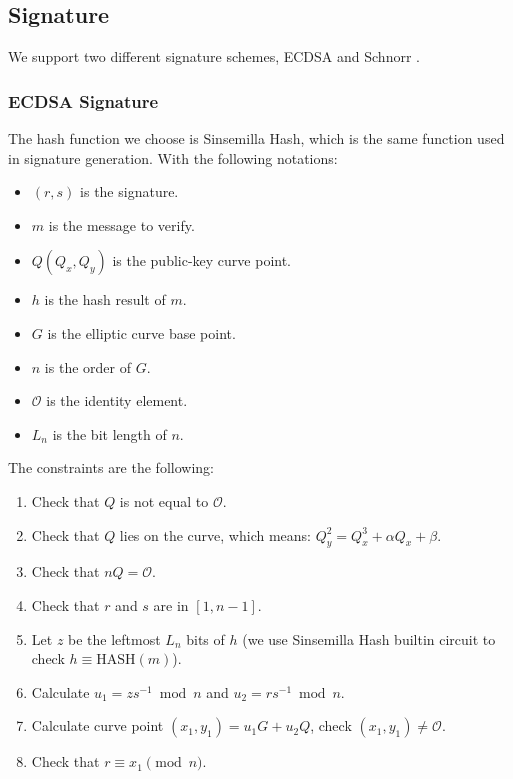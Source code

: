 \subsection{Signature}

We support two different signature schemes, ECDSA \cite{Johnson99theelliptic} and Schnorr \cite{jofc-1991-14302}.

\subsubsection{ECDSA Signature}

The hash function we choose is Sinsemilla Hash, which is the same function used in signature generation. With the following notations:
\begin{itemize}
    \item $(r, s)$ is the signature.
    \item $m$ is the message to verify.
    \item $Q(Q_x, Q_y)$ is the public-key curve point.
    \item $h$ is the hash result of $m$.
    \item $G$ is the elliptic curve base point.
    \item $n$ is the order of $G$.
    \item $\mathcal{O}$ is the identity element.
    \item $L_n$ is the bit length of $n$.
\end{itemize}

The constraints are the following:
\begin{enumerate}
    \item Check that $Q$ is not equal to $\mathcal{O}$.
    \item Check that $Q$ lies on the curve, which means: $Q_y^2 = Q_x^3+\alpha Q_x + \beta$.
    \item Check that $nQ = \mathcal{O}$.
    \item Check that $r$ and $s$ are in $[1, n-1]$.
    \item Let $z$ be the leftmost $L_n$ bits of $h$ (we use Sinsemilla Hash builtin circuit to check $h \equiv \mathrm{HASH}(m)$).
    \item Calculate $u_1 = zs^{-1} \bmod n$ and $u_2 = rs^{-1} \bmod n$.
    \item Calculate curve point $(x_1,y_1) = u_1 G + u_2 Q$, check $(x_1, y_1) \ne \mathcal{O}$.
    \item Check that $r \equiv x_1 \pmod n$.
\end{enumerate}

